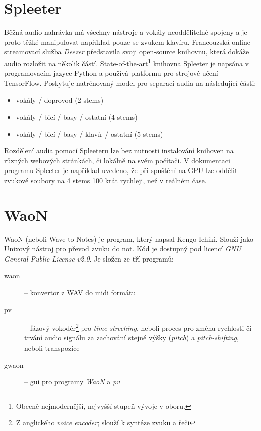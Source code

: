 \documentclass[thesis=B, czech]{FITthesis}[2019/03/06]
\begin{document}



\section{Spleeter}

Běžná audio nahrávka má všechny nástroje a vokály neoddělitelně spojeny a je proto těžké manipulovat například pouze se zvukem klavíru. Francouzská online streamovací služba \textit{Deezer} představila svoji open-source knihovnu, která dokáže audio rozložit na několik částí. State-of-the-art\footnote{Obecně nejmodernější, nejvyšší stupeň vývoje v oboru.} knihovna Spleeter\cite{spleeter2019} je napsána v programovacím jazyce Python a používá platformu pro strojové učení TensorFlow. Poskytuje natrénovaný model pro separaci audia na následující části:

\begin{itemize}
  \item vokály / doprovod (2 stems)
  \item vokály / bicí / basy / ostatní (4 stems)
  \item vokály / bicí / basy / klavír / ostatní (5 stems)
\end{itemize}

Rozdělení audia pomocí Spleeteru lze bez nutnosti instalování knihoven na různých webových stránkách, či lokálně na svém počítači. V dokumentaci programu Spleeter \cite{spleeterDoc} je například uvedeno, že při spuštění na GPU lze oddělit zvukové soubory na 4 stems 100 krát rychleji, než v reálném čase.


\section{WaoN}

WaoN (neboli Wave-to-Notes) je program, který napsal Kengo Ichiki. Slouží jako Unixový nástroj pro převod zvuku do not. Kód je dostupný pod licencí \textit{GNU General Public License v2.0}. Je složen ze tří programů:
\begin{description}
    \item [waon] -- konvertor z WAV do \gls{midi} formátu 
    \item [pv] -- fázový vokodér\footnote{Z anglického \textit{voice encoder}; slouží k syntéze zvuku a řeči} pro \textit{time-streching}, neboli proces pro změnu rychlosti či trvání audio signálu za zachování stejné výšky (\textit{pitch}) a \textit{pitch-shifting}, neboli transpozice
    \item [gwaon] -- \gls{gui} pro programy \textit{WaoN} a \textit{pv}
\end{description}
\end{document}
